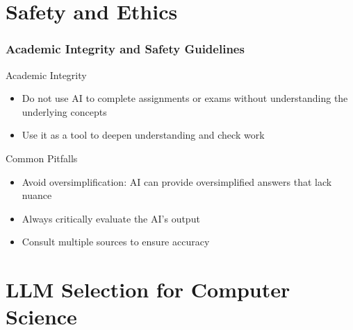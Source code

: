 \documentclass{beamer}
\begin{document}
\section{Safety and Ethics}
\frame{\sectionpage}
\begin{frame}
\frametitle{Academic Integrity and Safety Guidelines}
\begin{block}{Academic Integrity}
\begin{itemize}
\item Do not use AI to complete assignments or exams without understanding the underlying concepts
\item Use it as a tool to deepen understanding and check work
\end{itemize}
\end{block}

\begin{alertblock}{Common Pitfalls}
\begin{itemize}
\item Avoid oversimplification: AI can provide oversimplified answers that lack nuance
\item Always critically evaluate the AI's output
\item Consult multiple sources to ensure accuracy
\end{itemize}
\end{alertblock}
\end{frame}

\section{LLM Selection for Computer Science}
\frame{\sectionpage}
\end{document}
